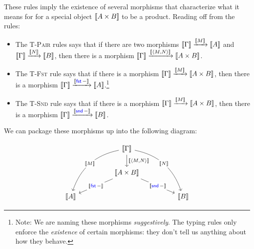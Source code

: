 These rules imply the existence of several morphisms that characterize 
what it means for for a special object $\left\llbracket A \times B \right\rrbracket$ to be a 
product. Reading off from the rules:
\begin{itemize}
  \item The \textsc{T-Pair} rules says that if there are 
  two morphisms $\left\llbracket \Gamma \right\rrbracket \xrightarrow{\left\llbracket M \right\rrbracket} \left\llbracket A \right\rrbracket$ and 
  $\left\llbracket \Gamma \right\rrbracket \xrightarrow{\left\llbracket N \right\rrbracket} \left\llbracket B \right\rrbracket$, 
  then there is a morphism $\left\llbracket \Gamma \right\rrbracket \xrightarrow{\left\llbracket \langle M, N \rangle \right\rrbracket} 
  \left\llbracket A \times B \right\rrbracket$.
  \item The \textsc{T-Fst} rule says that if there is a morphism 
  $\left\llbracket \Gamma \right\rrbracket \xrightarrow{\left\llbracket M \right\rrbracket} 
  \left\llbracket A \times B \right\rrbracket$, then there is a 
  morphism $\left\llbracket \Gamma \right\rrbracket \xrightarrow{\left\llbracket \mathsf{{\color{blue}fst}}\,- \right\rrbracket} \left\llbracket A \right\rrbracket$.\footnote{Note:
  We are naming these morphisms \emph{suggestively}. The typing rules only enforce 
  the \emph{existence} of certain morphisms: they don't tell us anything about 
  how they behave.}
  \item The \textsc{T-Snd} rule says that if there is a morphism 
  $\left\llbracket \Gamma \right\rrbracket \xrightarrow{\left\llbracket M \right\rrbracket} 
  \left\llbracket A \times B \right\rrbracket$, then there is a 
  morphism $\left\llbracket \Gamma \right\rrbracket \xrightarrow{\left\llbracket \mathsf{{\color{blue}snd}}\,- \right\rrbracket} \left\llbracket B \right\rrbracket$.
\end{itemize}

We can package these morphisms up into the following diagram:

\begin{equation}
\begin{tikzcd}[column sep = huge]
  & \dbracket{\Gamma} \arrow[d, "{\dbracket{\langle M, N\rangle }}"] \arrow[ldd, "\dbracket{M}" description, bend right] \arrow[rdd, "\dbracket{N}" description, bend left] &   \\
  & \dbracket{A \times B} \arrow[ld, "\dbracket{\plfst{-}}"' description] \arrow[rd, "\dbracket{\plsnd{-}}" description]                                                     &   \\
\dbracket{A} &                                                                                                     & \dbracket{B}
\end{tikzcd}
\label{cd:prod1}
\end{equation}

